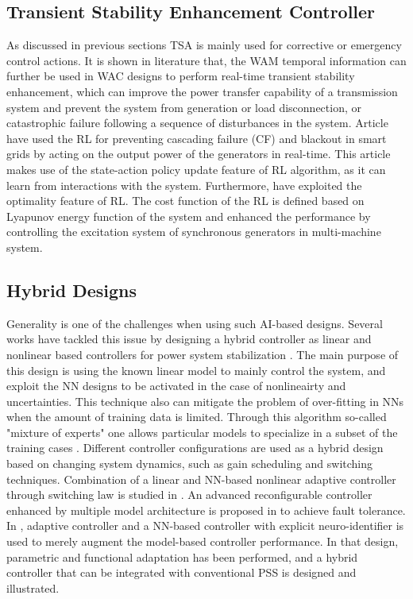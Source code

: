 \documentclass[journal]{IEEEtran}
\begin{document}
\subsection{Transient Stability Enhancement Controller}
As discussed in previous sections TSA is mainly used for corrective or emergency control actions. It is shown in literature that, the WAM temporal information can further be used in WAC designs to perform real-time transient stability enhancement, which can improve the power transfer capability of a transmission system and prevent the system from generation or load disconnection, or catastrophic failure following a sequence of disturbances in the system. Article \cite{zarrabian2016reinforcement} have used the RL for preventing cascading failure (CF) and blackout in smart grids by acting on the output power of the generators in real-time. This article makes use of the state-action policy update feature of RL algorithm, as it can learn from interactions with the system. Furthermore, \cite{yousefian2015hybrid} have exploited the optimality feature of RL. The cost function of the RL is defined based on Lyapunov energy function of the system and enhanced the performance by controlling the excitation system of synchronous generators in multi-machine system. 

\subsection{Hybrid Designs}
Generality is one of the challenges when using such AI-based designs. Several works have tackled this issue by designing a hybrid controller as linear and nonlinear based controllers for power system stabilization \cite{TransDKGM, 317979, 260921, 32483}. The main purpose of this design is using the known linear model to mainly control the system, and exploit the NN designs to be activated in the case of nonlineairty and uncertainties. This technique also can mitigate the problem of over-fitting in NNs when the amount of training data is limited. Through this algorithm so-called "mixture of experts" one allows particular models to specialize in a subset of the training cases \cite{jacobs1991adaptive}. Different controller configurations are used as a hybrid design based on changing system dynamics, such as gain scheduling and switching techniques. Combination of a linear and NN-based nonlinear adaptive controller through switching law is studied in \cite{bahita2012neural}. An advanced reconfigurable controller enhanced by multiple model architecture is proposed in \cite{1416876} to achieve fault tolerance. In \cite{TransDKGM}, adaptive controller and a NN-based controller with explicit neuro-identifier is used to merely augment the model-based controller performance. In that design, parametric and functional adaptation has been performed, and a hybrid controller that can be integrated with conventional PSS is designed and illustrated.
\end{document}
